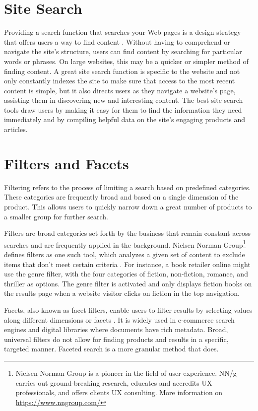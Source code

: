 \section{Site Search}
Providing a search function that searches your Web pages is a design strategy that offers users a way to find content \autocite{w3c2016search}. Without having to comprehend or navigate the site's structure, users can find content by searching for particular words or phrases. On large websites, this may be a quicker or simpler method of finding content. A great site search function is specific to the website and not only constantly indexes the site to make sure that access to the most recent content is simple, but it also directs users as they navigate a website's page, assisting them in discovering new and interesting content. The best site search tools draw users by making it easy for them to find the information they need immediately and by compiling helpful data on the site's engaging products and articles.


\section{Filters and Facets}
\label{filters_and_facets}
Filtering refers to the process of limiting a search based on predefined categories. These categories are frequently broad and based on a single dimension of the product. This allows users to quickly narrow down a great number of products to a smaller group for further search.

Filters are broad categories set forth by the business that remain constant across searches and are frequently applied in the background. Nielsen Norman Group\footnote{Nielsen Norman Group is a pioneer in the field of user experience. NN/g carries out ground-breaking research, educates and accredits UX professionals, and offers clients UX consulting. More information on \url{https://www.nngroup.com/}} defines filters as one such tool, which analyzes a given set of content to exclude items that don't meet certain criteria \autocite{whitenton2014filters}. For instance, a book retailer online might use the genre filter, with the four categories of fiction, non-fiction, romance, and thriller as options. The genre filter is activated and only displays fiction books on the results page when a website visitor clicks on fiction in the top navigation.

Facets, also known as facet filters, enable users to filter results by selecting values along different dimensions or facets \autocite{qu2021study}. It is widely used in e-commerce search engines and digital libraries where documents have rich metadata. Broad, universal filters do not allow for finding products and results in a specific, targeted manner. Faceted search is a more granular method that does.

